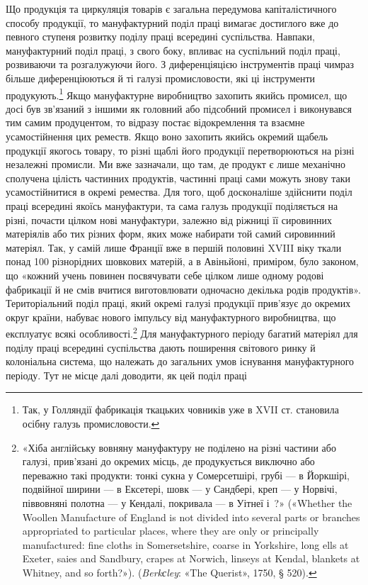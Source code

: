 Що продукція та циркуляція товарів є загальна передумова
капіталістичного способу продукції, то мануфактурний поділ
праці вимагає достиглого вже до певного ступеня розвитку поділу
праці всередині суспільства. Навпаки, мануфактурний поділ
праці, з свого боку, впливає на суспільний поділ праці, розвиваючи
та розгалужуючи його. З диференціяцією інструментів
праці чимраз більше диференціюються й ті галузі промисловости,
які ці інструменти продукують.\footnote{
Так, у Голляндії фабрикація ткацьких човників уже в XVII ст.
становила осібну галузь промисловости.
} Якщо мануфактурне виробництво
захопить якийсь промисел, що досі був зв’язаний з іншими
як головний або підсобний промисел і виконувався тим самим
продуцентом, то відразу постає відокремлення та взаємне усамостійнення
цих реместв. Якщо воно захопить якийсь окремий
щабель продукції якогось товару, то різні щаблі його продукції
перетворюються на різні незалежні промисли. Ми вже зазначали,
що там, де продукт є лише механічно сполучена цілість частинних
продуктів, частинні праці сами можуть знову таки усамостійнитися
в окремі ремества. Для того, щоб досконаліше здійснити
поділ праці всередині якоїсь мануфактури, та сама галузь
продукції поділяється на різні, почасти цілком нові мануфактури,
залежно від ріжниці її сировинних матеріялів або тих різних
форм, яких може набирати той самий сировинний матеріял.
Так, у самій лише Франції вже в першій половині XVIII віку
ткали понад 100 різнорідних шовкових матерій, а в Авіньйоні,
приміром, було законом, що «кожний учень повинен посвячувати
себе цілком лише одному родові фабрикації й не смів вчитися
виготовлювати одночасно декілька родів продуктів». Територіальний
поділ праці, який окремі галузі продукції прив’язує
до окремих округ країни, набуває нового імпульсу від мануфактурного
виробництва, що експлуатує всякі особливості.\footnote{
«Хіба англійську вовняну мануфактуру не поділено на різні
частини або галузі, прив’язані до окремих місць, де продукується виключно
або переважно такі продукти: тонкі сукна у Сомерсетшірі, грубі —
в Йоркшірі, подвійної ширини — в Ексетері, шовк — у Сандбері, креп —
у Норвічі, піввовняні полотна — у Кендалі, покривала — в Уітнеї і~?» («Whether the Woollen Manufacture of England is not divided
into several parts or branches appropriated to particular places, where
they are only or principally manufactured: fine cloths in Somersetshire,
coarse in Yorkshire, long ells at Exeter, saies and Sandbury, crapes at
Norwich, linseys at Kendal, blankets at Whitney, and so forth?»).
(\emph{Berkсley}: «The Querist», 1750, § 520).
} Для мануфактурного
періоду багатий матеріял для поділу праці всередині
суспільства дають поширення світового ринку й колоніальна
система, що належать до загальних умов існування мануфактурного
періоду. Тут не місце далі доводити, як цей поділ праці
\parbreak{}  %
